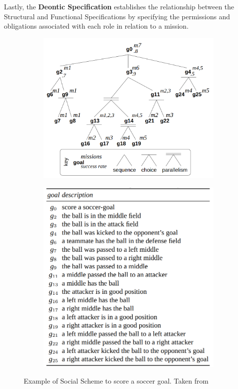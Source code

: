 Lastly, the \textbf{Deontic Specification} establishes the relationship between the Structural and Functional Specifications by specifying the permissions and obligations associated with each role in relation to a mission. 

\begin{figure}[!h]
    \centering
    \begin{subfigure}{.44\linewidth}
        \centering
        \includegraphics[width=\linewidth]{images/Moise - Social Scheme.png}
    \end{subfigure}
    \hfill
    \begin{subfigure}{.55\linewidth}
        \centering
        \includegraphics[width=0.8\linewidth]{images/Moise - Goals Descriptions.png}
    \end{subfigure}
    \caption{Example of Social Scheme to score a soccer goal. Taken from \cite{MOISEp}}
    \label{fig:moise_fs}
\end{figure}

